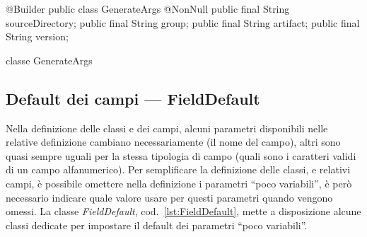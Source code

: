 \documentclass[a4paper,10pt]{report}
\newif\ifesource
\newenvironment{elisting}[1][H]
  {\captionsetup{aboveskip=0pt}\begin{listing}[#1]}
  {\end{listing}%
}
\begin{document}
\ifesource
\begin{figure*}[!htb]
\begin{lstlisting}[language=java, caption=classe GenerateArgs, 
label=lst:GenerateArgs]
@Builder
public class GenerateArgs {
    @NonNull public final String sourceDirectory;
    public final String group;
    public final String artifact;
    public final String version;
}
\end{lstlisting}\index{GenerateArgs}
\end{figure*}
\else
\begin{elisting}[!htb]
\begin{javacode}
@Builder
public class GenerateArgs {
    @NonNull public final String sourceDirectory;
    public final String group;
    public final String artifact;
    public final String version;
}
\end{javacode}
\caption{classe GenerateArgs}
\label{lst:GenerateArgs}
\end{elisting}
\fi

\subsection{Default dei campi --- FieldDefault}
Nella definizione delle classi e dei campi, alcuni parametri disponibili nelle
relative definizione cambiano necessariamente (il nome del campo), altri sono
quasi sempre uguali per la stessa tipologia di campo (quali sono i caratteri
validi di un campo alfanumerico).
Per semplificare la definizione delle classi, e relativi campi, è possibile
omettere nella definizione i parametri ``poco variabili'', è però necessario
indicare quale valore usare per questi parametri quando vengono omessi.
La classe \textsl{FieldDefault}, cod.~\ref{lst:FieldDefault}, mette a 
disposizione alcune classi dedicate per impostare il default dei parametri 
``poco variabili''.
\end{document}
